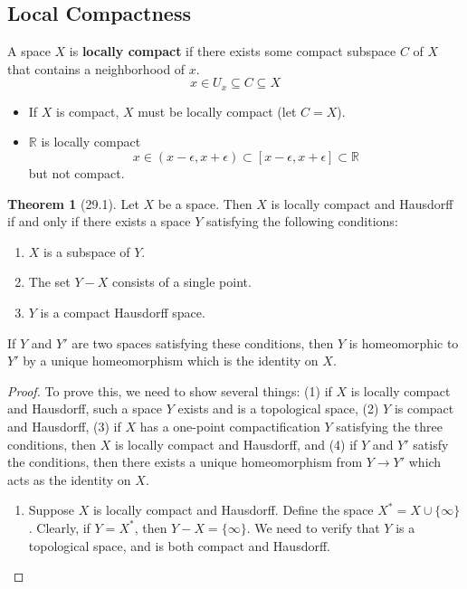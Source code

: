 \documentclass{article}
\newcommand{\nline}{\vspace*{0.5\baselineskip}}
\theoremstyle{definition}
\newtheorem{theorem}{Theorem}[subsection]
\begin{document}
\begin{flushleft}
\subsection{Local Compactness}

A space $X$ is \textbf{locally compact} if there exists some compact subspace $C$ of $X$ that contains a neighborhood of $x$.
\[
x \in U_x \subseteq C \subseteq X
\]
\begin{itemize}
    \item If $X$ is compact, $X$ must be locally compact (let $C = X$).
    \item $\mathbb{R}$ is locally compact
    \[
    x \in (x - \epsilon, x + \epsilon) \subset [x - \epsilon, x + \epsilon] \subset \mathbb{R}
    \]
    but not compact.
\end{itemize}

\begin{theorem}[29.1]
Let $X$ be a space. Then $X$ is locally compact and Hausdorff if and only if there exists a space $Y$ satisfying the following conditions:
\begin{enumerate}
    \item $X$ is a subspace of $Y$.
    \item The set $Y - X$ consists of a single point.
    \item $Y$ is a compact Hausdorff space.
\end{enumerate}
If $Y$ and $Y'$ are two spaces satisfying these conditions, then $Y$ is homeomorphic to $Y'$ by a unique homeomorphism which is the identity on $X$.
\end{theorem}

\begin{proof}
To prove this, we need to show several things: (1) if $X$ is locally compact and Hausdorff, such a space $Y$ exists and is a topological space, (2) $Y$ is compact and Hausdorff, (3) if $X$ has a one-point compactification $Y$ satisfying the three conditions, then $X$ is locally compact and Hausdorff, and (4) if $Y$ and $Y'$ satisfy the conditions, then there exists a unique homeomorphism from $Y \to Y'$ which acts as the identity on $X$.

\begin{enumerate}
    \item Suppose $X$ is locally compact and Hausdorff. Define the space $X^* = X \cup \{\infty\}$. Clearly, if $Y = X^*$, then $Y - X = \{\infty\}$. We need to verify that $Y$ is a topological space, and is both compact and Hausdorff.

    \nline


\end{enumerate}
\end{proof}
\end{flushleft}
\end{document}
